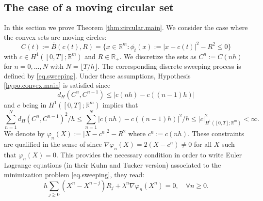 \documentclass[]{jnsao}
\renewcommand{\tr}{R}
\begin{document}


\subsection{The case of a moving circular set}\label{sec:circular}
 
In this section we prove Theorem \ref{thm:circular.main}. We consider the case where the convex sets are moving circles:
 \begin{equation}
 	C(t):= \overline{B}(c(t), R) = \{x \in \mathbb{R}^m:  \phi_t(x):= |x - c(t)|^2 -	 R^2 \leq 0\}
 \end{equation}
 with $c \in H^1([0,T];\mathbb{R}^m)$ and $R \in \mathbb{R}_+$.
We discretize the sets as $C^n:= C(nh)$ for $n=0,\dots,N$ with $N = \lfloor T/h \rfloor$.
The corresponding discrete sweeping process is defined by \eqref{eq.sweeping}. Under these assumptions,
Hypothesis \ref{hypo.convex.main} is satisfied since
 $$ d_H(C^{n},C^{n-1}) \leq |c(nh)-c((n-1)h)| $$ 
 and $c$ being in $H^1([0,T];\mathbb{R}^m)$ implies that 
 $$
 \sum_{n=1}^{N} d_H(C^{n},C^{n-1})^2/h \leq \sum_{n=1}^{N} |c(nh)-c((n-1)h)|^2/h \leq |c|_{H^1([0,T];\mathbb{R}^m)}^2 < \infty.
 $$
We denote by $\varphi_n(X):= |X - c^n|^2 - R^2$ where $c^n:= c(nh)$. These constraints
are qualified in the sense of \cite{Ciarlet89} since $\nabla \varphi_n(X) = 2 (X - c^n) \neq 0$ 
for all $X$ such that $\varphi_n(X) =0$.	This provides the necessary condition
in order to  write Euler Lagrange equations (in their Kuhn and Tucker version)  
associated to the minimization problem \eqref{eq.sweeping}, they read:
 \begin{equation}\label{eq.sweep.eul}
 	h \sum_{j\geq 0} (X^n - X^{n-j})\tr_j  + \lambda^n \nabla \varphi_n (X^n)=0, \quad \forall n\geq 0.
 \end{equation}
 
\end{document}
